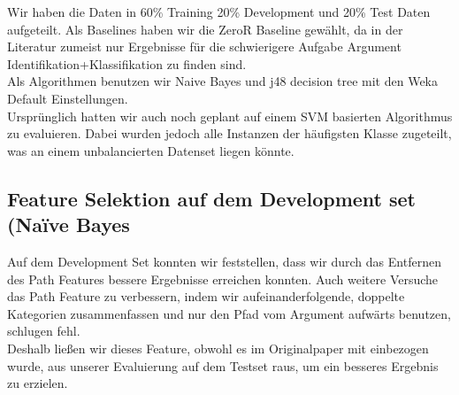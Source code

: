 \documentclass[]{article}
\begin{document}
Wir haben die Daten in 60\% Training 20\% Development und 20\% Test Daten aufgeteilt. 
Als Baselines haben wir die ZeroR Baseline gewählt, da in der Literatur zumeist nur Ergebnisse für die schwierigere Aufgabe Argument Identifikation+Klassifikation zu finden sind. \\
Als Algorithmen benutzen wir Naive Bayes und j48 decision tree mit den Weka Default Einstellungen. \\
Ursprünglich hatten wir auch noch geplant auf einem SVM basierten Algorithmus zu evaluieren. 
Dabei wurden jedoch alle Instanzen der häufigsten Klasse zugeteilt, was an einem unbalancierten Datenset liegen könnte.

\subsection{Feature Selektion auf dem Development set (Naïve Bayes}
\begin{table}[h]
\end{table}

Auf dem Development Set konnten wir feststellen, dass wir durch das Entfernen des Path Features bessere Ergebnisse erreichen konnten.
Auch weitere Versuche das Path Feature zu verbessern, indem wir aufeinanderfolgende, doppelte Kategorien zusammenfassen und nur den Pfad vom Argument aufwärts benutzen, schlugen fehl. \\
Deshalb ließen wir dieses Feature, obwohl es im Originalpaper mit einbezogen wurde, aus unserer Evaluierung auf dem Testset raus, um ein besseres Ergebnis zu erzielen.
\end{document}
